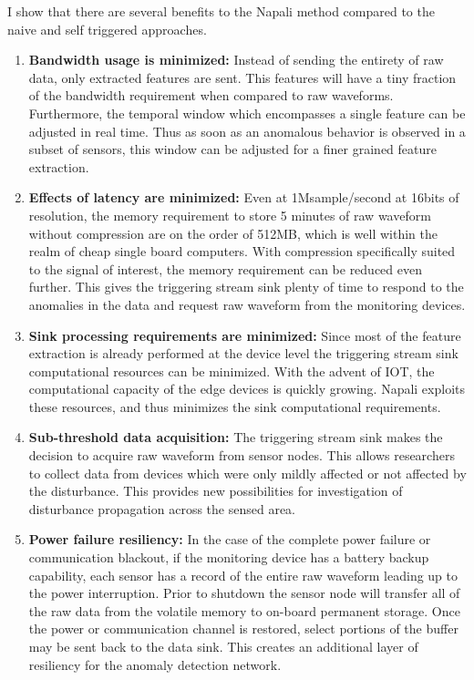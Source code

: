 I show that there are several benefits to the Napali method compared to the naive and self triggered approaches.
\begin{enumerate}
	\item \textbf{Bandwidth usage is minimized:} Instead of sending the entirety of raw data, only extracted features are sent.
	This features will have a tiny fraction of the bandwidth requirement when compared to raw waveforms.
	Furthermore, the temporal window which encompasses a single feature can be adjusted in real time.
	Thus as soon as an anomalous behavior is observed in a subset of sensors, this window can be adjusted for a finer grained feature extraction.
  
	\item \textbf{Effects of latency are minimized:} Even at 1Msample/second at 16bits of resolution, the memory requirement to store 5 minutes of raw waveform without compression are on the order of 512MB, which is well within the realm of cheap single board computers.
	With compression specifically suited to the signal of interest, the memory requirement can be reduced even further.
	This gives the triggering stream sink plenty of time to respond to the anomalies in the data and request raw waveform from the monitoring devices.
  
	\item \textbf{Sink processing requirements are minimized:} Since most of the feature extraction is already performed at the device level the triggering stream sink computational resources can be minimized.
	With the advent of IOT, the computational capacity of the edge devices is quickly growing.
	Napali exploits these resources, and thus minimizes the sink computational requirements.
  
	\item \textbf{Sub-threshold data acquisition:} The triggering stream sink makes the decision to acquire raw waveform from sensor nodes.
	This allows researchers to collect data from devices which were only mildly affected or not affected by the disturbance.
	This provides new possibilities for investigation of disturbance propagation across the sensed area.
  
	\item \textbf{Power failure resiliency:} In the case of the complete power failure or communication blackout, if the monitoring device has a battery backup capability, each sensor has a record of the entire raw waveform leading up to the power interruption.
	Prior to shutdown the sensor node will transfer all of the raw data from the volatile memory to on-board permanent storage.
	Once the power or communication channel is restored, select portions of the buffer may be sent back to the data sink.
	This creates an additional layer of resiliency for the anomaly detection network.
  

\end{enumerate}

